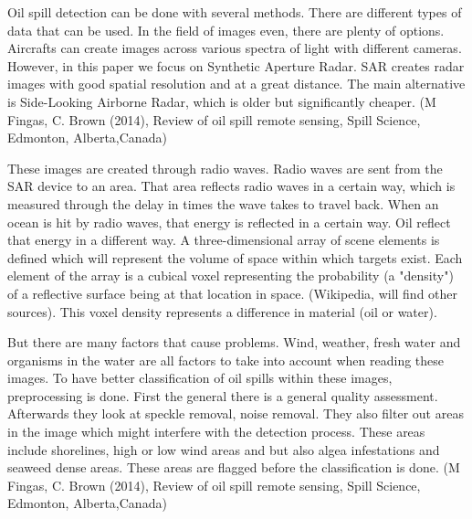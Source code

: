 \hspace{0.5cm} Oil spill detection can be done with several methods. There are different types of data that can be used. In the field of images even, there are plenty of options. Aircrafts can create images across various spectra of light with different cameras. However, in this paper we focus on Synthetic Aperture Radar. SAR creates radar images with good spatial resolution and at a great distance. The main alternative is Side-Looking Airborne Radar, which is older but significantly cheaper. (M Fingas, C. Brown (2014), Review of oil spill remote sensing, Spill Science, Edmonton, Alberta,Canada)

These images are created through radio waves. Radio waves are sent from the SAR device to an area. That area reflects radio waves in a certain way, which is measured through the delay in times the wave takes to travel back. When an ocean is hit by radio waves, that energy is reflected in a certain way. Oil reflect that energy in a different way. A three-dimensional array of scene elements is defined which will represent the volume of space within which targets exist. Each element of the array is a cubical voxel representing the probability (a "density") of a reflective surface being at that location in space. (Wikipedia, will find other sources). This voxel density represents a difference in material (oil or water).

But there are many factors that cause problems. Wind, weather, fresh water and organisms in the water are all factors to take into account when reading these images. To have better classification of oil spills within these images, preprocessing is done. First the general there is a general quality assessment. Afterwards they look at speckle removal, noise removal. They also filter out areas in the image which might interfere with the detection process. These areas include shorelines, high or low wind areas and but also algea infestations and seaweed dense areas. These areas are flagged before the classification is done. (M Fingas, C. Brown (2014), Review of oil spill remote sensing, Spill Science, Edmonton, Alberta,Canada)

